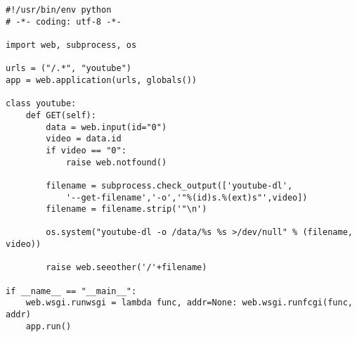 \begin{verbatim}
#!/usr/bin/env python
# -*- coding: utf-8 -*-

import web, subprocess, os

urls = ("/.*", "youtube")
app = web.application(urls, globals())

class youtube:
    def GET(self):
        data = web.input(id="0")
        video = data.id
        if video == "0":
            raise web.notfound()
      
        filename = subprocess.check_output(['youtube-dl',
            '--get-filename','-o','"%(id)s.%(ext)s"',video])
        filename = filename.strip('"\n')
        
        os.system("youtube-dl -o /data/%s %s >/dev/null" % (filename, video))

        raise web.seeother('/'+filename)

if __name__ == "__main__":
    web.wsgi.runwsgi = lambda func, addr=None: web.wsgi.runfcgi(func, addr)
    app.run()

\end{verbatim}